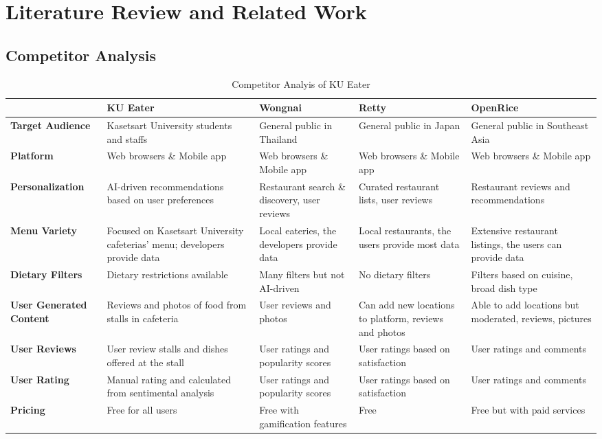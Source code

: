 \chapter{Literature Review and Related Work}
\label{chap:relatedworks}

\section{Competitor Analysis}
\label{section:competitor-analysis}

\begin{table}[h!]
    \begin{adjustwidth}{-.85in}{-.85in}
        \noindent
        \centering
        \small\begin{tabularx}{1.3\textwidth}{|X|>{\columncolor{green!20}}X|X|X|X|}
            \hline & \textbf{KU Eater} & \textbf{Wongnai} & \textbf{Retty} & \textbf{OpenRice} \\\hline
            \textbf{Target Audience} & Kasetsart University students and staffs & General public in Thailand & General public in Japan & General public in Southeast Asia \\\hline
            \textbf{Platform} & Web browsers \& Mobile app & Web browsers \& Mobile app & Web browsers \& Mobile app & Web browsers \& Mobile app \\\hline
            \textbf{Personalization} & AI-driven recommendations based on user preferences & Restaurant search \& discovery, user reviews & Curated restaurant lists, user reviews & Restaurant reviews and recommendations \\\hline
            \textbf{Menu Variety} & Focused on Kasetsart University cafeterias' menu; developers provide data & Local eateries, the developers provide data & Local restaurants, the users provide most data & Extensive restaurant listings, the users can provide data \\\hline
            \textbf{Dietary Filters} & Dietary restrictions available & Many filters but not AI-driven & No dietary filters & Filters based on cuisine, broad dish type \\\hline
            \textbf{User Generated Content} & Reviews and photos of food from stalls in cafeteria & User reviews and photos & Can add new locations to platform, reviews and photos & Able to add locations but moderated, reviews, pictures \\\hline
            \textbf{User Reviews} & User review stalls and dishes offered at the stall & User ratings and popularity scores & User ratings based on satisfaction & User ratings and comments \\\hline
            \textbf{User Rating} & Manual rating and calculated from sentimental analysis & User ratings and popularity scores & User ratings based on satisfaction & User ratings and comments \\\hline
            \textbf{Pricing} & Free for all users & Free with gamification features & Free & Free but with paid services \\\hline
        \end{tabularx}
    \end{adjustwidth}
    \caption{Competitor Analyis of KU Eater}
\end{table}

